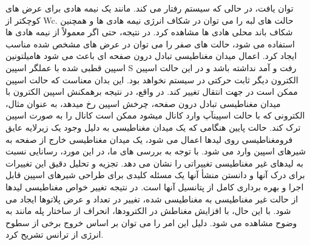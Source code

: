 توان یافت، در حالی که سیستم رفتار می کند. مانند یک نیمه هادی برای عرض های کوچکتر از Wc. حالت های لبه را می توان در شکاف انرژی نیمه هادی ها و همچنین شکاف باند محلی هادی ها مشاهده کرد. در نتیجه، حتی اگر معمولاً از نیمه هادی ها استفاده می شود، حالت های صفر را می توان در عرض های مشخص شده مناسب ایجاد کرد. اعمال میدان مغناطیسی تبادل درون صفحه ای باعث می شود هامیلتونین اسپین قطبی شده با عملگر اسپین S رفت و آمد نداشته باشد و در این حالت اسپین الکترون دیگر ثابت حرکتی در سیستم نخواهد بود. این بدان معناست که حالت اسپین ممکن است در جهت انتقال تغییر کند. در واقع، در نتیجه برهمکنش اسپین الکترون با میدان مغناطیسی تبادل درون صفحه، چرخش اسپین رخ میدهد، به عنوان مثال، الکترونی که با حالت اسپینآپ وارد کانال میشود ممکن است کانال را به صورت اسپین ترک کند. حالت پایین هنگامی که یک میدان مغناطیسی به دلیل وجود یک زیرلایه عایق فرومغناطیسی روی لیدها اعمال می شود، یک میدان مغناطیسی خارج از صفحه به شیرهای اسپین وارد می شود. با توجه به بررسی های ما، در این مورد، رسانایی نسبت به لیدهای غیر مغناطیسی تغییراتی را نشان می دهد. تجزیه و تحلیل دقیق این تغییرات برای درک آنها و دانستن منشأ آنها یک مسئله کلیدی برای طراحی شیرهای اسپین قابل اجرا و بهره برداری کامل از پتانسیل آنها است. در نتیجه تغییر خواص مغناطیسی لیدها از حالت غیر مغناطیسی به مغناطیسی شده، تغییر در تعداد و عرض پلاتوها ایجاد می شود. با این حال، با افزایش مغناطش در الکترودها، انحراف از ساختار پله مانند به وضوح مشاهده می شود. دلیل این امر را می توان بر اساس خروج برخی از سطوح انرژی از ترانس تشریح کرد.
